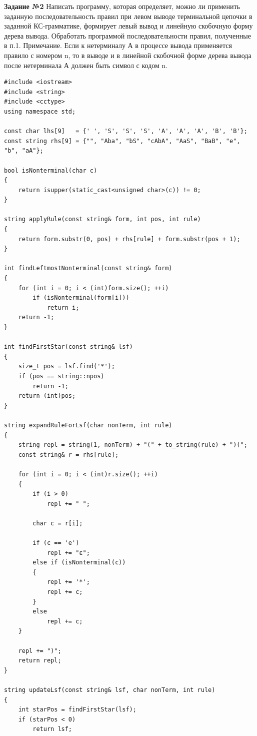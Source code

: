    \textbf{Задание №2} Написать программу, которая определяет, можно ли применить заданную последовательность правил при левом выводе терминальной
    цепочки в заданной КС-грамматике, формирует левый вывод и линейную скобочную форму дерева вывода. Обработать программой последовательности правил, полученные в п.1.
    Примечание. Если к нетерминалу А в процессе вывода применяется
    правило с номером n, то в выводе и в линейной скобочной форме дерева вывода после нетерминала А должен быть символ с кодом n. \label{sec:2}

    \begin{verbatim}
#include <iostream>
#include <string>
#include <cctype>
using namespace std;

const char lhs[9]   = {' ', 'S', 'S', 'S', 'A', 'A', 'A', 'B', 'B'};
const string rhs[9] = {"", "Aba", "bS", "cAbA", "AaS", "BaB", "e", "b", "aA"};

bool isNonterminal(char c)
{
    return isupper(static_cast<unsigned char>(c)) != 0;
}

string applyRule(const string& form, int pos, int rule)
{
    return form.substr(0, pos) + rhs[rule] + form.substr(pos + 1);
}

int findLeftmostNonterminal(const string& form)
{
    for (int i = 0; i < (int)form.size(); ++i)
        if (isNonterminal(form[i]))
            return i;
    return -1;
}

int findFirstStar(const string& lsf)
{
    size_t pos = lsf.find('*');
    if (pos == string::npos)
        return -1;
    return (int)pos;
}

string expandRuleForLsf(char nonTerm, int rule)
{
    string repl = string(1, nonTerm) + "(" + to_string(rule) + ")(";
    const string& r = rhs[rule];

    for (int i = 0; i < (int)r.size(); ++i)
    {
        if (i > 0)
            repl += " ";

        char c = r[i];

        if (c == 'e')
            repl += "ε";
        else if (isNonterminal(c))
        {
            repl += '*';
            repl += c;
        }
        else
            repl += c;
    }

    repl += ")";
    return repl;
}

string updateLsf(const string& lsf, char nonTerm, int rule)
{
    int starPos = findFirstStar(lsf);
    if (starPos < 0)
        return lsf;


\end{verbatim}
